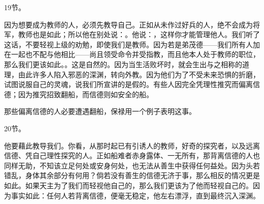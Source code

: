 19节。\par

因为想要成为教师的人，必须先教导自己。正如从未作过好兵的人，绝不会成为将军，教师也是如此；所以他在别处说：。他说：，这样你才能管理他人。我们听了这话，不要轻视上级的劝勉，即使我们是教师。因为若是弟茂德——我们所有人加在一起也不配与他相比——尚且领受命令并受指教，而且他本人处于教师的职位，那么我们更该如此。。这是自然的。因为当生活败坏时，就会生出与之相称的道理，由此许多人陷入邪恶的深渊，转向外教。因为他们为了不受未来恐惧的折磨，试图说服自己的灵魂，说我们所宣讲的是假的。有些人因完全凭理性推究而偏离信德；因为推究招致翻船，而信德则如安全的船。\par

那些偏离信德的人必要遭遇翻船，保禄用一个例子表明这事。\par

20节。\par

他要藉此教导我们。你看，从那时起已有引诱人的教师，好奇的探究者，以及远离信德、凭自己理性探究的人。正如船难者赤身露体、一无所有，那背离信德的人也同样无助，不知该立足何处或安身何处，也无法从善生中获得任何益处。因为头若错乱，身体其余部分有何用？倘若没有善生的信德无济于事，那么相反的情况更是如此。如果天主为了我们而轻视他自己的，那么我们更该为了他而轻视自己的。因为事实如此：任何人若背离信德，便毫无稳定，他左右漂浮，直到最终沉入深渊。\par

